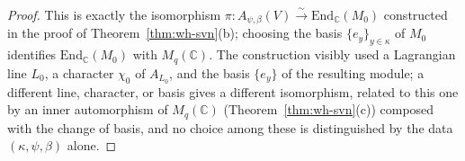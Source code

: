 
\begin{proof}
This is exactly the isomorphism $\pi:A_{\psi,\beta}(V)\xrightarrow{\sim}\mathrm{End}_{\mathbb{C}}(M_0)$
constructed in the proof of Theorem~\ref{thm:wh-svn}(b); choosing the basis
$\{e_y\}_{y\in\kappa}$ of $M_0$ identifies $\mathrm{End}_{\mathbb{C}}(M_0)$
with $M_q(\mathbb{C})$. The construction visibly used a Lagrangian line $L_0$,
a character $\chi_0$ of $A_{L_0}$, and the basis $\{e_y\}$ of the resulting
module; a different line, character, or basis gives a different isomorphism,
related to this one by an inner automorphism of $M_q(\mathbb{C})$
(Theorem~\ref{thm:wh-svn}(c)) composed with the change of basis, and no
choice among these is distinguished by the data $(\kappa,\psi,\beta)$ alone.
\end{proof}
